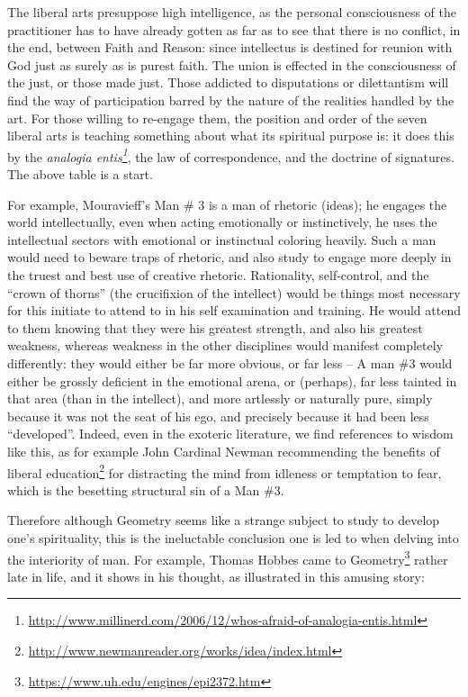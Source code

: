 The liberal arts presuppose high intelligence, as the personal consciousness of the practitioner has to have already gotten as far as to see that there is no conflict, in the end, between Faith and Reason: since intellectus is destined for reunion with God just as surely as is purest faith. The union is effected in the consciousness of the just, or those made just. Those addicted to disputations or dilettantism will find the way of participation barred by the nature of the realities handled by the art. For those willing to re-engage them, the position and order of the seven liberal arts is teaching something about what its spiritual purpose is: it does this by the \emph{analogia entis\footnote{\url{http://www.millinerd.com/2006/12/whos-afraid-of-analogia-entis.html}}}, the law of correspondence, and the doctrine of signatures. The above table is a start.

For example, Mouravieff's Man \# 3 is a man of rhetoric (ideas); he engages the world intellectually, even when acting emotionally or instinctively, he uses the intellectual sectors with emotional or instinctual coloring heavily. Such a man would need to beware traps of rhetoric, and also study to engage more deeply in the truest and best use of creative rhetoric. Rationality, self-control, and the ``crown of thorns'' (the crucifixion of the intellect) would be things most necessary for this initiate to attend to in his self examination and training. He would attend to them knowing that they were his greatest strength, and also his greatest weakness, whereas weakness in the other disciplines would manifest completely differently: they would either be far more obvious, or far less -- A man \#3 would either be grossly deficient in the emotional arena, or (perhaps), far less tainted in that area (than in the intellect), and more artlessly or naturally pure, simply because it was not the seat of his ego, and precisely because it had been less ``developed''. Indeed, even in the exoteric literature, we find references to wisdom like this, as for example John Cardinal Newman recommending the benefits of liberal education\footnote{\url{http://www.newmanreader.org/works/idea/index.html}} for distracting the mind from idleness or temptation to fear, which is the besetting structural sin of a Man \#3.

Therefore although Geometry seems like a strange subject to study to develop one's spirituality, this is the ineluctable conclusion one is led to when delving into the interiority of man. For example, Thomas Hobbes came to Geometry\footnote{\url{https://www.uh.edu/engines/epi2372.htm}} rather late in life, and it shows in his thought, as illustrated in this amusing story:

